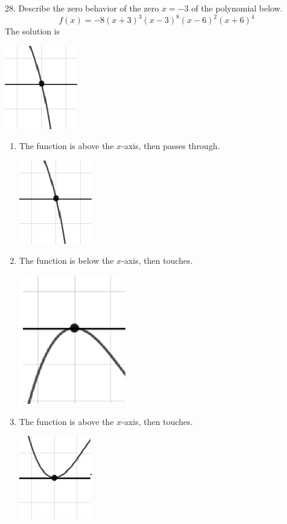 \documentclass{article}[10pt]
\begin{document}
28. Describe the zero behavior of the zero $x = -3$ of the polynomial below.
$$ f(x) = -8(x + 3)^{3}(x - 3)^{8}(x - 6)^{2}(x + 6)^{4} $$ 
The solution is  
\begin{center}\includegraphics[scale=0.5]{../Figures/zeroBehaviorNegativeOdd.png}\end{center}\begin{enumerate}[label=\Alph*.] 
\item The function is above the $x$-axis, then passes through. 
\begin{center}\includegraphics[scale=0.5]{../Figures/zeroBehaviorNegativeOdd.png}\end{center} 
 
\item The function is below the $x$-axis, then touches. 
\begin{center}\includegraphics[scale=0.5]{../Figures/zeroBehaviorNegativeEven.png}\end{center} 
 
\item The function is above the $x$-axis, then touches. 
\begin{center}\includegraphics[scale=0.5]{../Figures/zeroBehaviorPositiveEven.png}\end{center} 
 

\end{enumerate}
\end{document}
